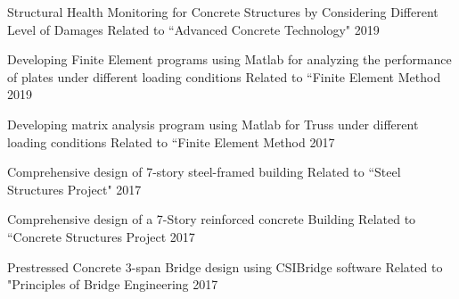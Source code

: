



\begin{cvhonors}


  \cvhonor
    {Structural Health Monitoring for Concrete Structures by Considering Different Level of Damages} %
    {Related to “Advanced Concrete Technology"} %
    {} %
    {2019} %

\vspace{10pt}
  \cvhonor
    {Developing Finite Element programs using Matlab for analyzing the performance of plates under different loading conditions} %
    {Related to “Finite Element Method} %
    {} %
    {2019} %

\vspace{10pt}    
  \cvhonor
    {Developing matrix analysis program using Matlab for Truss under different loading conditions} %
    {Related to “Finite Element Method} %
    {} %
    {2017} %

\vspace{10pt}    
  \cvhonor
    {Comprehensive design of 7-story steel-framed building} %
    {Related to “Steel Structures Project"} %
    {} %
    {2017} %
    
\vspace{10pt}   
  \cvhonor
    {Comprehensive design of a 7-Story reinforced concrete Building} %
    {Related to “Concrete Structures Project} %
    {} %
    {2017} %

\vspace{10pt}
  \cvhonor
    {Prestressed Concrete 3-span Bridge design using CSIBridge software} %
    {Related to "Principles of Bridge Engineering} %
    {} %
    {2017} %
    

\end{cvhonors}
